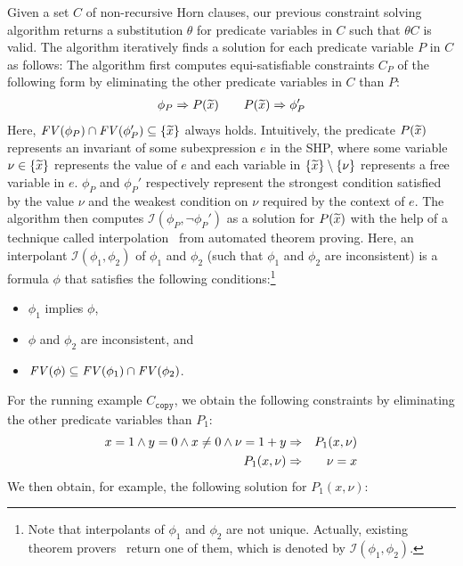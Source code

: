 Given a set \(C\) of non-recursive Horn clauses, our previous constraint
solving algorithm returns a substitution \(\theta\) for predicate
variables in \(C\) such that \(\theta C\) is valid.
The algorithm iteratively finds a solution for each predicate variable
\(P\) in \(C\) as follows:  The algorithm first computes equi-satisfiable
constraints \(C_P\) of the following form by eliminating the other
predicate variables in \(C\) than \(P\):
\begin{eqnarray*}
\phi_{P} \Rightarrow P(\widetilde{x}) \qquad
P(\widetilde{x}) \Rightarrow \phi_{P}'
\end{eqnarray*}
Here, \(\mathit{FV}({\phi_{P}}) \cap \mathit{FV}({\phi_{P}'}) \subseteq \{{\widetilde{x}}\}\)
always holds.  Intuitively, the predicate \(P(\widetilde{x})\) represents an
invariant of some subexpression \(e\) in the SHP, where some variable
\(\nu \in\{{\widetilde{x}}\}\) represents the value of \(e\) and each variable
in \(\{{\widetilde{x}}\} \setminus \{{\nu}\}\) represents a free variable in
\(e\).  \(\phi_P\) and \(\phi_{P}'\) respectively represent the
strongest condition satisfied by the value \(\nu\) and the weakest
condition on \(\nu\) required by the context of \(e\).
%
The algorithm then computes \(\mathcal{I}(\phi_P,\neg \phi_P')\) as a
solution for \(P(\widetilde{x})\) with the help of a technique called
interpolation~\cite{McMillan2005,Beyer2008} from automated theorem
proving.  Here, an interpolant \(\mathcal{I}(\phi_1,\phi_2)\) of
\(\phi_1\) and \(\phi_2\) (such that \(\phi_1\) and \(\phi_2\) are
inconsistent) is a formula \(\phi\) that satisfies the following
conditions:\footnote{Note that interpolants of \(\phi_1\) and \(\phi_2\)
are not unique.  Actually, existing theorem
provers~\cite{McMillan2005,Beyer2008} return one of them, which is
denoted by \(\mathcal{I}(\phi_1,\phi_2)\).}
\begin{itemize}
\item \(\phi_1\) implies \(\phi\),
\item \(\phi\) and \(\phi_2\) are inconsistent, and
\item \(\mathit{FV}({\phi}) \subseteq \mathit{FV}({\phi_1}) \cap \mathit{FV}({\phi_2})\).
\end{itemize}
%
For the running example \(C_{\texttt{copy}}\), we obtain the following
constraints by eliminating the other predicate variables than \(P_1\):
\begin{eqnarray*}
x=1 \land y=0 \land x\neq0 \land \nu=1+y &\Rightarrow& P_1(x,\nu) \\
P_1(x,\nu) &\Rightarrow& \nu=x
\end{eqnarray*}
We then obtain, for example, the following solution for \(P_1(x,\nu)\):
